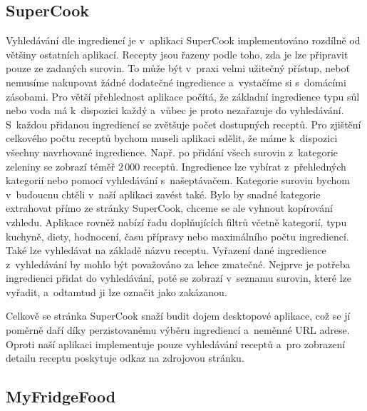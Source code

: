 \subsection{SuperCook}

Vyhledávání dle ingrediencí je v~aplikaci SuperCook implementováno rozdílně od většiny ostatních aplikací. Recepty jsou řazeny podle toho, zda je lze připravit pouze ze zadaných surovin. To může být v~praxi velmi užitečný přístup, neboť nemusíme nakupovat žádné dodatečné ingredience a~vystačíme si s~domácími zásobami. Pro větší přehlednost aplikace počítá, že základní ingredience typu sůl nebo voda má k~dispozici každý a~vůbec je proto nezařazuje do vyhledávání. S~každou přidanou ingrediencí se zvětšuje počet dostupných receptů. Pro zjištění celkového počtu receptů bychom museli aplikaci sdělit, že máme k~dispozici všechny navrhované ingredience. Např. po přidání všech surovin z~kategorie zeleniny se zobrazí téměř $2\,000$ receptů. Ingredience lze vybírat z~přehledných kategorií nebo pomocí vyhledávání s~našeptávačem. Kategorie surovin bychom v~budoucnu chtěli v~naší aplikaci zavést také. Bylo by snadné kategorie extrahovat přímo ze stránky SuperCook, chceme se ale vyhnout kopírování vzhledu. Aplikace rovněž nabízí řadu doplňujících filtrů včetně kategorií, typu kuchyně, diety, hodnocení, času přípravy nebo maximálního počtu ingrediencí. Také lze vyhledávat na základě názvu receptu. Vyřazení dané ingredience z~vyhledávání by mohlo být považováno za lehce zmatečné. Nejprve je potřeba ingredienci přidat do vyhledávání, poté se zobrazí v~seznamu surovin, které lze vyřadit, a~odtamtud ji lze označit jako zakázanou.

Celkově se stránka SuperCook snaží budit dojem desktopové aplikace, což se jí poměrně daří díky perzistovanému výběru ingrediencí a~neměnné URL adrese. Oproti naší aplikaci implementuje pouze vyhledávání receptů a~pro zobrazení detailu receptu poskytuje odkaz na zdrojovou stránku. 

\subsection{MyFridgeFood}

